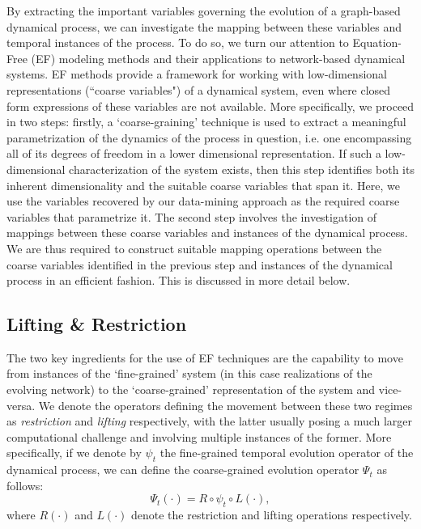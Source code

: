 By extracting the important variables governing the evolution of a
graph-based dynamical process, we can investigate the mapping between
these variables and temporal instances of the process. To do so, we
turn our attention to Equation-Free (EF) modeling methods
\cite{kevrekidis2003equation} \cite{kevrekidis2004equation} and their
applications to network-based dynamical systems. EF methods provide a
framework for working with low-dimensional representations (``coarse
variables") of a dynamical system, even where closed form expressions
of these variables are not available. More specifically, we proceed in
two steps: firstly, a `coarse-graining' technique is used to extract a
meaningful parametrization of the dynamics of the process in question,
i.e. one encompassing all of its degrees of freedom in a lower
dimensional representation. If such a low-dimensional characterization
of the system exists, then this step identifies both its inherent
dimensionality and the suitable coarse variables that span it. Here,
we use the variables recovered by our data-mining approach as the
required coarse variables that parametrize it. The second step
involves the investigation of mappings between these coarse variables
and instances of the dynamical process. We are thus required to
construct suitable mapping operations between the coarse variables
identified in the previous step and instances of the dynamical process
in an efficient fashion. This is discussed in more detail below.



\subsection{Lifting \& Restriction}

The two key ingredients for the use of EF techniques are the
capability to move from instances of the `fine-grained' system (in
this case realizations of the evolving network) to the
`coarse-grained' representation of the system and vice-versa. We
denote the operators defining the movement between these two regimes
as {\em restriction} and {\em lifting} respectively, with the latter
usually posing a much larger computational challenge and involving
multiple instances of the former. More specifically, if we denote by
$\psi_t$ the fine-grained temporal evolution operator of the dynamical
process, we can define the coarse-grained evolution operator $\Psi_t$
as follows:
\begin{equation}
  \Psi_t ( \cdot ) = R \circ \psi_t \circ L ( \cdot ),
\end{equation}
\noindent where $R(\cdot)$ and $L(\cdot)$ denote the restriction and
lifting operations respectively.

